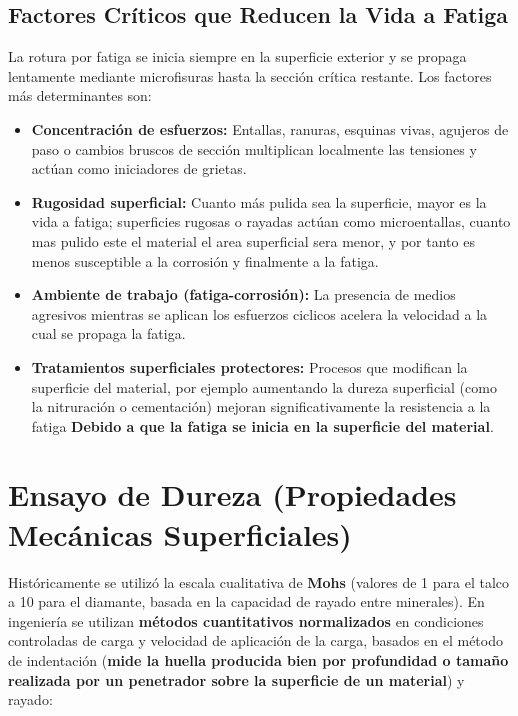 \subsection{Factores Críticos que Reducen la Vida a Fatiga}
La rotura por fatiga se inicia siempre en la superficie exterior y se propaga lentamente mediante microfisuras hasta la sección crítica restante. Los factores más determinantes son:
\begin{itemize}
    \item \textbf{Concentración de esfuerzos:} Entallas, ranuras, esquinas vivas, agujeros de paso o cambios bruscos de sección multiplican localmente las tensiones y actúan como iniciadores de grietas.
    \item \textbf{Rugosidad superficial:} Cuanto más pulida sea la superficie, mayor es la vida a fatiga; superficies rugosas o rayadas actúan como microentallas, cuanto mas pulido este el material el area superficial sera menor, y por tanto es menos susceptible a la corrosión y finalmente a la fatiga.
    \item \textbf{Ambiente de trabajo (fatiga-corrosión):} La presencia de medios agresivos mientras se aplican los esfuerzos ciclicos acelera la velocidad a la cual se propaga la fatiga.
    \item \textbf{Tratamientos superficiales protectores:} Procesos que modifican la superficie del material, por ejemplo aumentando la dureza superficial (como la nitruración o cementación) mejoran significativamente la resistencia a la fatiga \textbf{Debido a que la fatiga se inicia en la superficie del material}.
\end{itemize}

\section{Ensayo de Dureza (Propiedades Mecánicas Superficiales)}



Históricamente se utilizó la escala cualitativa de \textbf{Mohs} (valores de 1 para el talco a 10 para el diamante, basada en la capacidad de rayado entre minerales). En ingeniería se utilizan \textbf{métodos cuantitativos normalizados} en condiciones controladas de carga y velocidad de aplicación de la carga, basados en el método de indentación (\textbf{mide la huella producida bien por profundidad o tamaño realizada por un penetrador sobre la superficie de un material}) y rayado:

